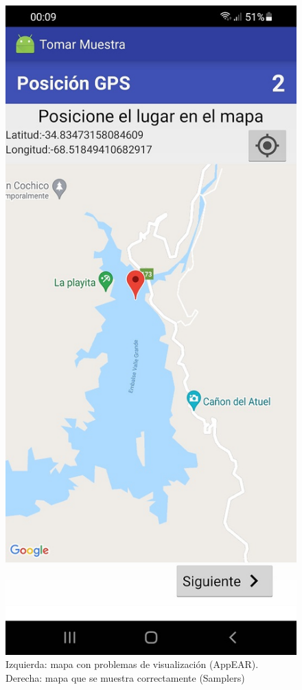 \begin{figure}[H]
   \includegraphics[scale=0.3]{06-caso_de_uso/samplers_mapa.jpg} 
    \caption{Izquierda: mapa con problemas de visualización (AppEAR). Derecha:  mapa que se muestra correctamente (Samplers)}
\end{figure}


